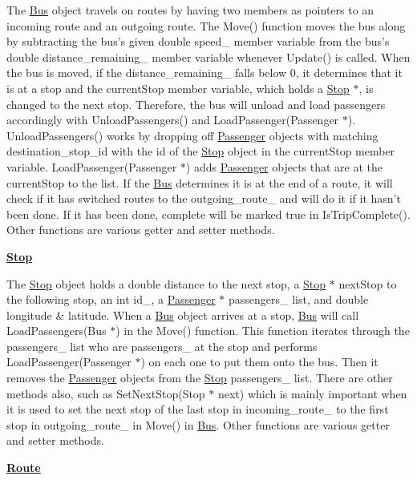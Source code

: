 The \hyperlink{classBus}{Bus} object travels on routes by having two members as pointers to an incoming route and an outgoing route. The Move() function moves the bus along by subtracting the bus’s given double speed\+\_\+ member variable from the bus’s double distance\+\_\+remaining\+\_\+ member variable whenever Update() is called. When the bus is moved, if the distance\+\_\+remaining\+\_\+ falls below 0, it determines that it is at a stop and the current\+Stop member variable, which holds a \hyperlink{classStop}{Stop} $\ast$, is changed to the next stop. Therefore, the bus will unload and load passengers accordingly with Unload\+Passengers() and Load\+Passenger(\+Passenger $\ast$). Unload\+Passengers() works by dropping off \hyperlink{classPassenger}{Passenger} objects with matching destination\+\_\+stop\+\_\+id with the id of the \hyperlink{classStop}{Stop} object in the current\+Stop member variable. Load\+Passenger(\+Passenger $\ast$) adds \hyperlink{classPassenger}{Passenger} objects that are at the current\+Stop to the list. If the \hyperlink{classBus}{Bus} determines it is at the end of a route, it will check if it has switched routes to the outgoing\+\_\+route\+\_\+ and will do it if it hasn’t been done. If it has been done, complete will be marked true in Is\+Trip\+Complete(). Other functions are various getter and setter methods.

{\bfseries \hyperlink{classStop}{Stop}}

The \hyperlink{classStop}{Stop} object holds a double distance to the next stop, a \hyperlink{classStop}{Stop} $\ast$ next\+Stop to the following stop, an int id\+\_\+, a \hyperlink{classPassenger}{Passenger} $\ast$ passengers\+\_\+ list, and double longitude \& latitude. When a \hyperlink{classBus}{Bus} object arrives at a stop, \hyperlink{classBus}{Bus} will call Load\+Passengers(\+Bus $\ast$) in the Move() function. This function iterates through the passengers\+\_\+ list who are passengers\+\_\+ at the stop and performs Load\+Passenger(\+Passenger $\ast$) on each one to put them onto the bus. Then it removes the \hyperlink{classPassenger}{Passenger} objects from the \hyperlink{classStop}{Stop} passengers\+\_\+ list. There are other methods also, such as Set\+Next\+Stop(\+Stop $\ast$ next) which is mainly important when it is used to set the next stop of the last stop in incoming\+\_\+route\+\_\+ to the first stop in outgoing\+\_\+route\+\_\+ in Move() in \hyperlink{classBus}{Bus}. Other functions are various getter and setter methods.

{\bfseries \hyperlink{classRoute}{Route}}


